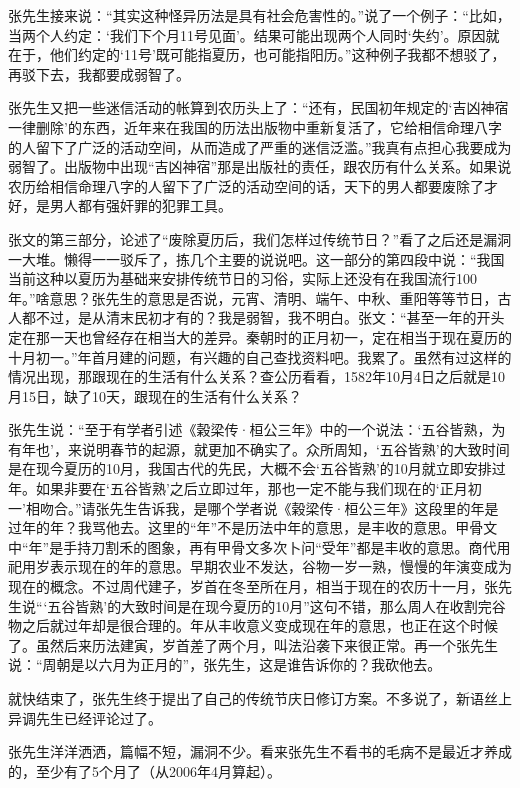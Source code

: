 张先生接来说：“其实这种怪异历法是具有社会危害性的。”说了一个例子：“比如，当两个人约定：‘我们下个月11号见面’。结果可能出现两个人同时‘失约’。原因就在于，他们约定的‘11号’既可能指夏历，也可能指阳历。”这种例子我都不想驳了，再驳下去，我都要成弱智了。

张先生又把一些迷信活动的帐算到农历头上了：“还有，民国初年规定的‘吉凶神宿一律删除’的东西，近年来在我国的历法出版物中重新复活了，它给相信命理八字的人留下了广泛的活动空间，从而造成了严重的迷信泛滥。”我真有点担心我要成为弱智了。出版物中出现“吉凶神宿”那是出版社的责任，跟农历有什么关系。如果说农历给相信命理八字的人留下了广泛的活动空间的话，天下的男人都要废除了才好，是男人都有强奸罪的犯罪工具。

张文的第三部分，论述了“废除夏历后，我们怎样过传统节日？”看了之后还是漏洞一大堆。懒得一一驳斥了，拣几个主要的说说吧。这一部分的第四段中说：“我国当前这种以夏历为基础来安排传统节日的习俗，实际上还没有在我国流行100年。”啥意思？张先生的意思是否说，元宵、清明、端午、中秋、重阳等等节日，古人都不过，是从清末民初才有的？我是弱智，我不明白。张文：“甚至一年的开头定在那一天也曾经存在相当大的差异。秦朝时的正月初一，定在相当于现在夏历的十月初一。”年首月建的问题，有兴趣的自己查找资料吧。我累了。虽然有过这样的情况出现，那跟现在的生活有什么关系？查公历看看，1582年10月4日之后就是10月15日，缺了10天，跟现在的生活有什么关系？

张先生说：“至于有学者引述《榖梁传·桓公三年》中的一个说法：‘五谷皆熟，为有年也’，来说明春节的起源，就更加不确实了。众所周知，‘五谷皆熟’的大致时间是在现今夏历的10月，我国古代的先民，大概不会‘五谷皆熟’的10月就立即安排过年。如果非要在‘五谷皆熟’之后立即过年，那也一定不能与我们现在的‘正月初一’相吻合。”请张先生告诉我，是哪个学者说《榖梁传·桓公三年》这段里的年是过年的年？我骂他去。这里的“年”不是历法中年的意思，是丰收的意思。甲骨文中“年”是手持刀割禾的图象，再有甲骨文多次卜问“受年”都是丰收的意思。商代用祀用岁表示现在的年的意思。早期农业不发达，谷物一岁一熟，慢慢的年演变成为现在的概念。不过周代建子，岁首在冬至所在月，相当于现在的农历十一月，张先生说“‘五谷皆熟’的大致时间是在现今夏历的10月”这句不错，那么周人在收割完谷物之后就过年却是很合理的。年从丰收意义变成现在年的意思，也正在这个时候了。虽然后来历法建寅，岁首差了两个月，叫法沿袭下来很正常。再一个张先生说：“周朝是以六月为正月的”，张先生，这是谁告诉你的？我砍他去。

就快结束了，张先生终于提出了自己的传统节庆日修订方案。不多说了，新语丝上异调先生已经评论过了。

张先生洋洋洒洒，篇幅不短，漏洞不少。看来张先生不看书的毛病不是最近才养成的，至少有了5个月了（从2006年4月算起）。